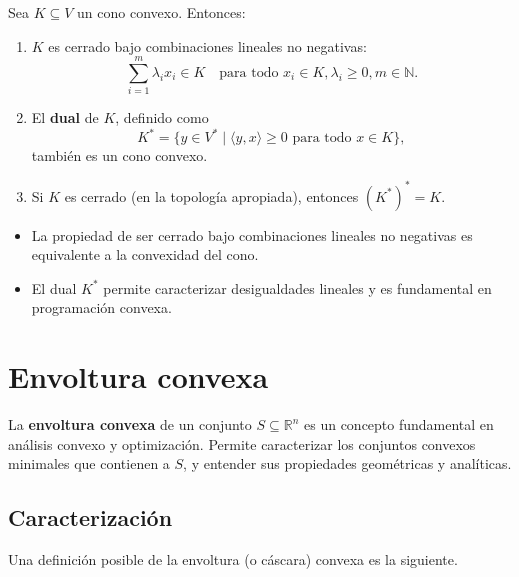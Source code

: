 \documentclass[12pt]{book}
\theoremstyle{definition}
\theoremstyle{plain}
\newtheorem{teorema}{Teorema}[section]
\theoremstyle{remark}
\newtheorem{observacion}{Observación}[section]
\begin{document}
Sea \( K \subseteq V \) un cono convexo. Entonces:
\begin{enumerate}
    \item \( K \) es cerrado bajo combinaciones lineales no negativas:
    \[
    \sum_{i=1}^m \lambda_i x_i \in K \quad \text{para todo } x_i \in K, \lambda_i \geq 0, m \in \mathbb{N}.
    \]
    \item El \textbf{dual} de \( K \), definido como
    \[
    K^* = \{ y \in V^* \mid \langle y, x \rangle \geq 0 \text{ para todo } x \in K \},
    \]
    también es un cono convexo.
    \item Si \( K \) es cerrado (en la topología apropiada), entonces \( (K^*)^* = K \).
\end{enumerate}

\begin{itemize}
    \item La propiedad de ser cerrado bajo combinaciones lineales no negativas es equivalente a la convexidad del cono.
    \item El dual \( K^* \) permite caracterizar desigualdades lineales y es fundamental en programación convexa.
\end{itemize}


\section{Envoltura convexa}

La \textbf{envoltura convexa} de un conjunto \( S \subseteq \mathbb{R}^n \) es un concepto fundamental en análisis convexo y optimización. Permite caracterizar los conjuntos convexos minimales que contienen a \( S \), y entender sus propiedades geométricas y analíticas.

\subsection{Caracterizaci\'on}

Una definici\'on posible de la envoltura (o c\'ascara) convexa es la siguiente.
\end{document}

